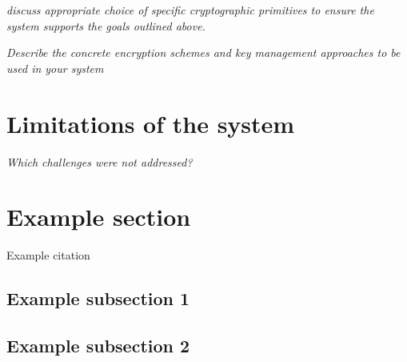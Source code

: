\documentclass[11pt]{article}
\begin{document}
\begin{flushleft}
		\textit{discuss appropriate choice of specific cryptographic primitives to ensure the system supports the goals outlined above.}

		\textit{Describe the concrete encryption schemes and key management approaches to be used in your system}

		\section{Limitations of the system}

		\textit{Which challenges were not addressed?}
		
		\section{Example section}
		
		Example citation \cite{neuman2009challenges}
		
		\subsection{Example subsection 1}
		
		\subsection{Example subsection 2}
		
		\newpage
		
		
		
		
		
		
	\end{flushleft}
	
\end{document}
